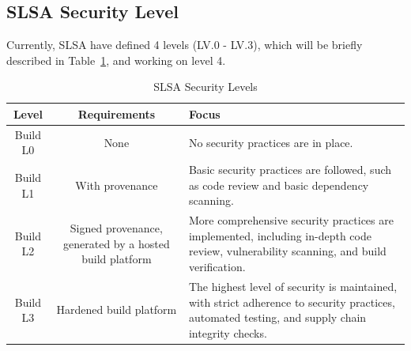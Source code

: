 \subsection{SLSA Security Level}
Currently, SLSA have defined 4 levels (LV.0 - LV.3), which will be 
briefly described in Table~\ref{tab:slsa-levels}, and working on level 4.
\begin{table}[ht]
  \centering
  \caption{SLSA Security Levels}
  \label{tab:slsa-levels}
  \begin{tabular}{|c|c|p{6cm}|}
  \hline
  \textbf{Level} & \textbf{Requirements} & \textbf{Focus} \\
  \hline
  Build L0 & None & No security practices are in place. \\
  \hline
  Build L1 & With provenance & Basic security practices are followed, such as code review and basic dependency scanning. \\
  \hline
  Build L2 & Signed provenance, generated by a hosted build platform & More comprehensive security practices are implemented, including in-depth code review, vulnerability scanning, and build verification. \\
  \hline
  Build L3 & Hardened build platform & The highest level of security is maintained, with strict adherence to security practices, automated testing, and supply chain integrity checks. \\
  \hline
  \end{tabular}
\end{table}


